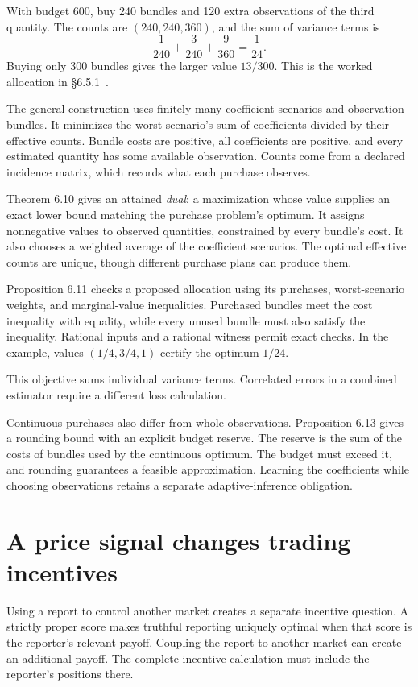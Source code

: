 \documentclass{momentum}
\begin{document}
With budget 600, buy 240 bundles and 120 extra observations of the third quantity. The counts are $(240,240,360)$, and the sum of variance terms is
\[
\frac1{240}+\frac3{240}+\frac9{360}=\frac1{24}.
\]
Buying only 300 bundles gives the larger value $13/300$. This is the worked allocation in \S6.5.1~\cite{parlay}.

The general construction uses finitely many coefficient scenarios and observation bundles. It minimizes the worst scenario's sum of coefficients divided by their effective counts. Bundle costs are positive, all coefficients are positive, and every estimated quantity has some available observation. Counts come from a declared incidence matrix, which records what each purchase observes.

Theorem 6.10 gives an attained \emph{dual}: a maximization whose value supplies an exact lower bound matching the purchase problem's optimum. It assigns nonnegative values to observed quantities, constrained by every bundle's cost. It also chooses a weighted average of the coefficient scenarios. The optimal effective counts are unique, though different purchase plans can produce them.

Proposition 6.11 checks a proposed allocation using its purchases, worst-scenario weights, and marginal-value inequalities. Purchased bundles meet the cost inequality with equality, while every unused bundle must also satisfy the inequality. Rational inputs and a rational witness permit exact checks. In the example, values $(1/4,3/4,1)$ certify the optimum $1/24$.

This objective sums individual variance terms. Correlated errors in a combined estimator require a different loss calculation.

Continuous purchases also differ from whole observations. Proposition 6.13 gives a rounding bound with an explicit budget reserve. The reserve is the sum of the costs of bundles used by the continuous optimum. The budget must exceed it, and rounding guarantees a feasible approximation. Learning the coefficients while choosing observations retains a separate adaptive-inference obligation.

\section{A price signal changes trading incentives}

Using a report to control another market creates a separate incentive question. A strictly proper score makes truthful reporting uniquely optimal when that score is the reporter's relevant payoff. Coupling the report to another market can create an additional payoff. The complete incentive calculation must include the reporter's positions there.
\end{document}
